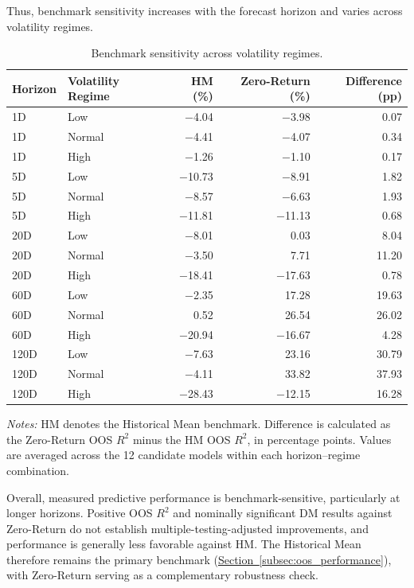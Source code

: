 \documentclass[runningheads,orivec]{llncs}
\begin{document}
Thus, benchmark sensitivity increases with the forecast horizon and varies across volatility regimes.

\begin{table}[htbp]
\centering
\caption{Benchmark sensitivity across volatility regimes.}\label{tab:benchmark_regimes}
{\small
\setlength{\tabcolsep}{7pt}
\begin{tabular}{llrrr}
\hline
Horizon & Volatility Regime & HM (\%) & Zero-Return (\%) & Difference (pp) \\
\hline
1D   & Low    & $-$4.04  & $-$3.98  &  0.07 \\
1D   & Normal & $-$4.41  & $-$4.07  &  0.34 \\
1D   & High   & $-$1.26  & $-$1.10  &  0.17 \\
\hline
5D   & Low    & $-$10.73 & $-$8.91  &  1.82 \\
5D   & Normal & $-$8.57  & $-$6.63  &  1.93 \\
5D   & High   & $-$11.81 & $-$11.13 &  0.68 \\
\hline
20D  & Low    & $-$8.01  &  0.03  &  8.04 \\
20D  & Normal & $-$3.50  &  7.71  & 11.20 \\
20D  & High   & $-$18.41 & $-$17.63 &  0.78 \\
\hline
60D  & Low    & $-$2.35  & 17.28  & 19.63 \\
60D  & Normal &  0.52  & 26.54  & 26.02 \\
60D  & High   & $-$20.94 & $-$16.67 &  4.28 \\
\hline
120D & Low    & $-$7.63  & 23.16  & 30.79 \\
120D & Normal & $-$4.11  & 33.82  & 37.93 \\
120D & High   & $-$28.43 & $-$12.15 & 16.28 \\
\hline
\end{tabular}}
\par\vspace{4pt}\parbox{\linewidth}{\linespread{1.2}\selectfont\footnotesize\textit{Notes:} HM denotes the Historical Mean benchmark. Difference is calculated as the Zero-Return OOS $R^2$ minus the HM OOS $R^2$, in percentage points. Values are averaged across the 12 candidate models within each horizon--regime combination.\par}
\end{table}

Overall, measured predictive performance is benchmark-sensitive, particularly at longer horizons. Positive OOS $R^2$ and nominally significant DM results against Zero-Return do not establish multiple-testing-adjusted improvements, and performance is generally less favorable against HM. The Historical Mean therefore remains the primary benchmark (\hyperref[subsec:oos_performance]{Section~\ref*{subsec:oos_performance}}), with Zero-Return serving as a complementary robustness check.
\end{document}
